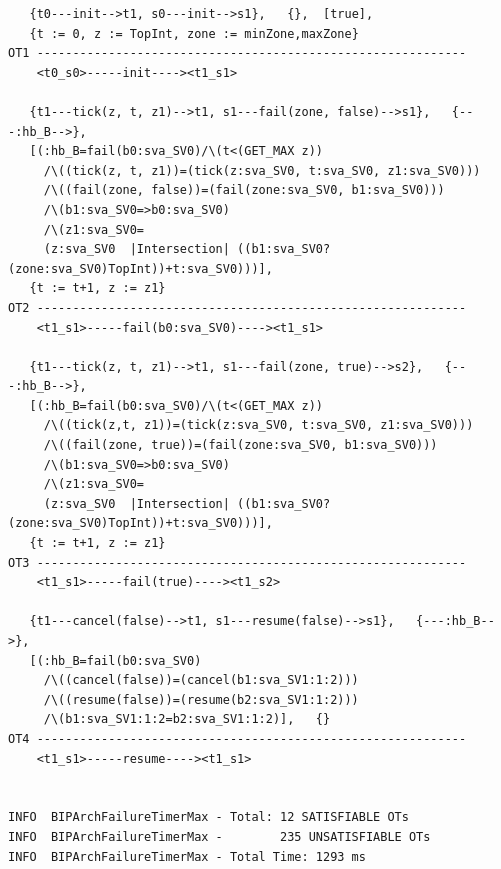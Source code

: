 \documentclass{llncs}
\makeatletter
\newcommand{\verbatimfont}[1]{\renewcommand{\verbatim@font}{\ttfamily#1}}
\makeatother
\begin{document}
\verbatimfont{\small}
\begin{verbatim}
   {t0---init-->t1, s0---init-->s1},   {},  [true],
   {t := 0, z := TopInt, zone := minZone,maxZone}
OT1 ------------------------------------------------------------
    <t0_s0>-----init----><t1_s1>

   {t1---tick(z, t, z1)-->t1, s1---fail(zone, false)-->s1},   {---:hb_B-->},
   [(:hb_B=fail(b0:sva_SV0)/\(t<(GET_MAX z))
     /\((tick(z, t, z1))=(tick(z:sva_SV0, t:sva_SV0, z1:sva_SV0)))
     /\((fail(zone, false))=(fail(zone:sva_SV0, b1:sva_SV0)))
     /\(b1:sva_SV0=>b0:sva_SV0)
     /\(z1:sva_SV0=
     (z:sva_SV0  |Intersection| ((b1:sva_SV0?(zone:sva_SV0)TopInt))+t:sva_SV0)))],
   {t := t+1, z := z1}
OT2 ------------------------------------------------------------
    <t1_s1>-----fail(b0:sva_SV0)----><t1_s1>

   {t1---tick(z, t, z1)-->t1, s1---fail(zone, true)-->s2},   {---:hb_B-->},
   [(:hb_B=fail(b0:sva_SV0)/\(t<(GET_MAX z))
     /\((tick(z,t, z1))=(tick(z:sva_SV0, t:sva_SV0, z1:sva_SV0)))
     /\((fail(zone, true))=(fail(zone:sva_SV0, b1:sva_SV0)))
     /\(b1:sva_SV0=>b0:sva_SV0)
     /\(z1:sva_SV0=
     (z:sva_SV0  |Intersection| ((b1:sva_SV0?(zone:sva_SV0)TopInt))+t:sva_SV0)))],
   {t := t+1, z := z1}
OT3 ------------------------------------------------------------
    <t1_s1>-----fail(true)----><t1_s2>

   {t1---cancel(false)-->t1, s1---resume(false)-->s1},   {---:hb_B-->},
   [(:hb_B=fail(b0:sva_SV0)
     /\((cancel(false))=(cancel(b1:sva_SV1:1:2)))
     /\((resume(false))=(resume(b2:sva_SV1:1:2)))
     /\(b1:sva_SV1:1:2=b2:sva_SV1:1:2)],   {}
OT4 ------------------------------------------------------------
    <t1_s1>-----resume----><t1_s1>


INFO  BIPArchFailureTimerMax - Total: 12 SATISFIABLE OTs
INFO  BIPArchFailureTimerMax -        235 UNSATISFIABLE OTs
INFO  BIPArchFailureTimerMax - Total Time: 1293 ms
\end{verbatim}


\end{document}
